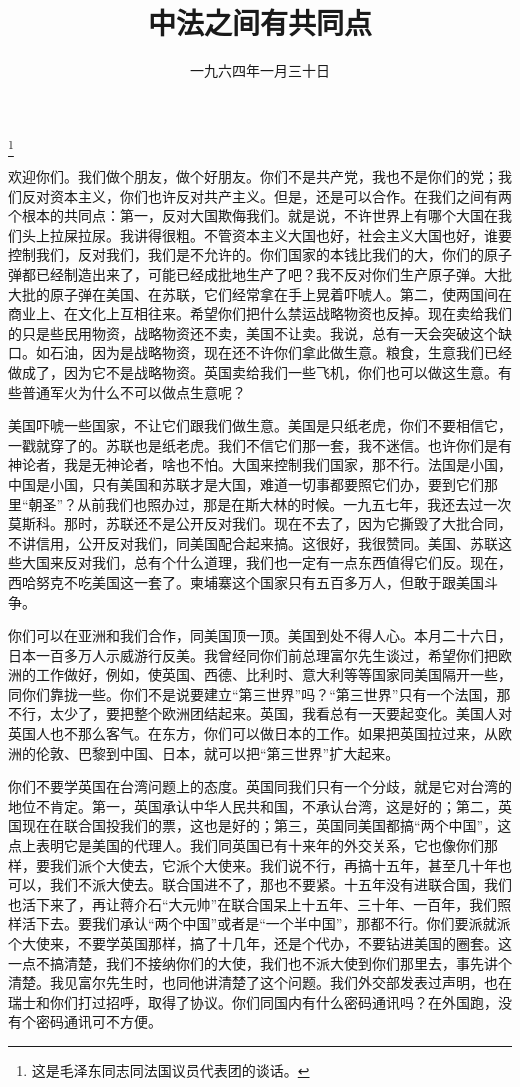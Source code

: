 
\title{中法之间有共同点}
\date{一九六四年一月三十日}
\thanks{这是毛泽东同志同法国议员代表团的谈话。}
\maketitle


欢迎你们。我们做个朋友，做个好朋友。你们不是共产党，我也不是你们的党；我们反对资本主义，你们也许反对共产主义。但是，还是可以合作。在我们之间有两个根本的共同点：第一，反对大国欺侮我们。就是说，不许世界上有哪个大国在我们头上拉屎拉尿。我讲得很粗。不管资本主义大国也好，社会主义大国也好，谁要控制我们，反对我们，我们是不允许的。你们国家的本钱比我们的大，你们的原子弹都已经制造出来了，可能已经成批地生产了吧？我不反对你们生产原子弹。大批大批的原子弹在美国、在苏联，它们经常拿在手上晃着吓唬人。第二，使两国间在商业上、在文化上互相往来。希望你们把什么禁运战略物资也反掉。现在卖给我们的只是些民用物资，战略物资还不卖，美国不让卖。我说，总有一天会突破这个缺口。如石油，因为是战略物资，现在还不许你们拿此做生意。粮食，生意我们已经做成了，因为它不是战略物资。英国卖给我们一些飞机，你们也可以做这生意。有些普通军火为什么不可以做点生意呢？

美国吓唬一些国家，不让它们跟我们做生意。美国是只纸老虎，你们不要相信它，一戳就穿了的。苏联也是纸老虎。我们不信它们那一套，我不迷信。也许你们是有神论者，我是无神论者，啥也不怕。大国来控制我们国家，那不行。法国是小国，中国是小国，只有美国和苏联才是大国，难道一切事都要照它们办，要到它们那里“朝圣”？从前我们也照办过，那是在斯大林的时候。一九五七年，我还去过一次莫斯科。那时，苏联还不是公开反对我们。现在不去了，因为它撕毁了大批合同，不讲信用，公开反对我们，同美国配合起来搞。这很好，我很赞同。美国、苏联这些大国来反对我们，总有个什么道理，我们也一定有一点东西值得它们反。现在，西哈努克不吃美国这一套了。柬埔寨这个国家只有五百多万人，但敢于跟美国斗争。

你们可以在亚洲和我们合作，同美国顶一顶。美国到处不得人心。本月二十六日，日本一百多万人示威游行反美。我曾经同你们前总理富尔先生谈过，希望你们把欧洲的工作做好，例如，使英国、西德、比利时、意大利等等国家同美国隔开一些，同你们靠拢一些。你们不是说要建立“第三世界”吗？“第三世界”只有一个法国，那不行，太少了，要把整个欧洲团结起来。英国，我看总有一天要起变化。美国人对英国人也不那么客气。在东方，你们可以做日本的工作。如果把英国拉过来，从欧洲的伦敦、巴黎到中国、日本，就可以把“第三世界”扩大起来。

你们不要学英国在台湾问题上的态度。英国同我们只有一个分歧，就是它对台湾的地位不肯定。第一，英国承认中华人民共和国，不承认台湾，这是好的；第二，英国现在在联合国投我们的票，这也是好的；第三，英国同美国都搞“两个中国”，这点上表明它是美国的代理人。我们同英国已有十来年的外交关系，它也像你们那样，要我们派个大使去，它派个大使来。我们说不行，再搞十五年，甚至几十年也可以，我们不派大使去。联合国进不了，那也不要紧。十五年没有进联合国，我们也活下来了，再让蒋介石“大元帅”在联合国呆上十五年、三十年、一百年，我们照样活下去。要我们承认“两个中国”或者是“一个半中国”，那都不行。你们要派就派个大使来，不要学英国那样，搞了十几年，还是个代办，不要钻进美国的圈套。这一点不搞清楚，我们不接纳你们的大使，我们也不派大使到你们那里去，事先讲个清楚。我见富尔先生时，也同他讲清楚了这个问题。我们外交部发表过声明，也在瑞士和你们打过招呼，取得了协议。你们同国内有什么密码通讯吗？在外国跑，没有个密码通讯可不方便。

